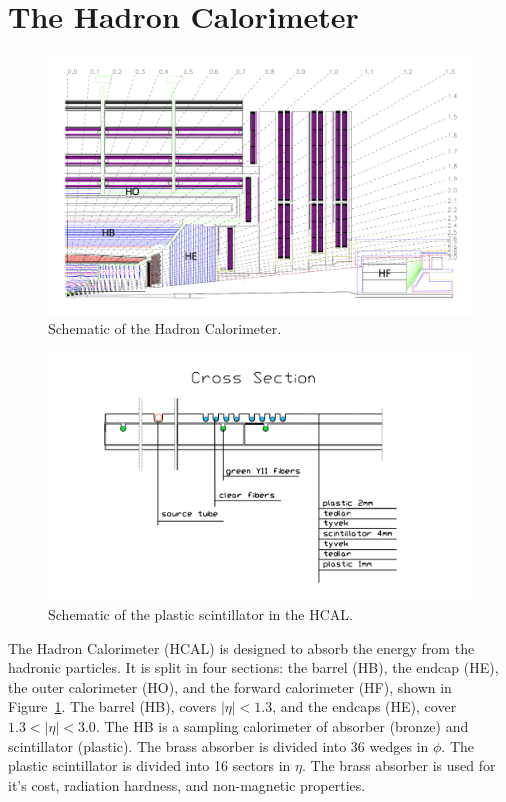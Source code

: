 \vspace{-3pt}
\section{The Hadron Calorimeter}\label{sec:ch3:hcal}

\begin{figure}[h]
\centering
\includegraphics[width=1.0\textwidth]{figures/HCAL.png}
\caption{Schematic of the Hadron Calorimeter.}
\label{fig:HCAL}
\end{figure}


\begin{figure}[h]
\centering
\includegraphics[width=1.0\textwidth]{figures/hcal_scintillator_replace.png}
\caption{Schematic of the plastic scintillator in the HCAL.}
\label{fig:HCAL_scint}
\end{figure}

The Hadron Calorimeter (HCAL) is designed to absorb the energy from the hadronic particles. It is split in four sections: the barrel (HB), the endcap (HE), the outer calorimeter (HO), and the forward calorimeter (HF), shown in Figure~\ref{fig:HCAL}. The barrel (HB), covers $|\eta| < 1.3$, and the endcaps (HE), cover $1.3 < |\eta| < 3.0$. The HB is a sampling calorimeter of absorber (bronze) and scintillator (plastic). The brass absorber is divided into 36 wedges in $\phi$. The plastic scintillator is divided into 16 sectors in $\eta$. The brass absorber is used for it's cost, radiation hardness, and non-magnetic properties.

